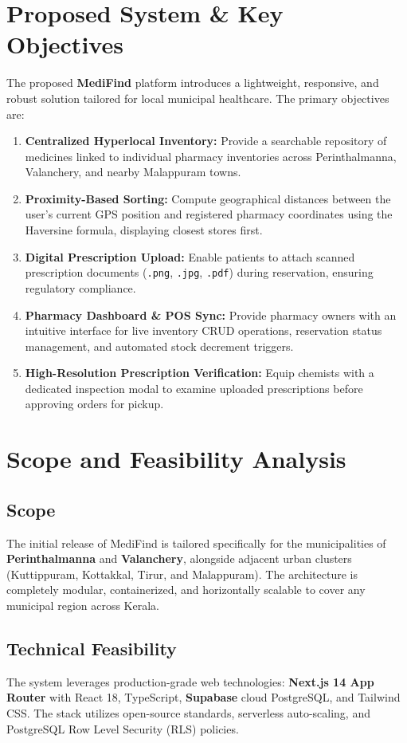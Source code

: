 \documentclass[12pt,a4paper]{report}
\begin{document}
\section{Proposed System \& Key Objectives}
The proposed \textbf{MediFind} platform introduces a lightweight, responsive, and robust solution tailored for local municipal healthcare. The primary objectives are:
\begin{enumerate}
    \item \textbf{Centralized Hyperlocal Inventory:} Provide a searchable repository of medicines linked to individual pharmacy inventories across Perinthalmanna, Valanchery, and nearby Malappuram towns.
    \item \textbf{Proximity-Based Sorting:} Compute geographical distances between the user's current GPS position and registered pharmacy coordinates using the Haversine formula, displaying closest stores first.
    \item \textbf{Digital Prescription Upload:} Enable patients to attach scanned prescription documents (\texttt{.png}, \texttt{.jpg}, \texttt{.pdf}) during reservation, ensuring regulatory compliance.
    \item \textbf{Pharmacy Dashboard \& POS Sync:} Provide pharmacy owners with an intuitive interface for live inventory CRUD operations, reservation status management, and automated stock decrement triggers.
    \item \textbf{High-Resolution Prescription Verification:} Equip chemists with a dedicated inspection modal to examine uploaded prescriptions before approving orders for pickup.
\end{enumerate}

\section{Scope and Feasibility Analysis}

\subsection{Scope}
The initial release of MediFind is tailored specifically for the municipalities of \textbf{Perinthalmanna} and \textbf{Valanchery}, alongside adjacent urban clusters (Kuttippuram, Kottakkal, Tirur, and Malappuram). The architecture is completely modular, containerized, and horizontally scalable to cover any municipal region across Kerala.

\subsection{Technical Feasibility}
The system leverages production-grade web technologies: \textbf{Next.js 14 App Router} with React 18, TypeScript, \textbf{Supabase} cloud PostgreSQL, and Tailwind CSS. The stack utilizes open-source standards, serverless auto-scaling, and PostgreSQL Row Level Security (RLS) policies.
\end{document}
